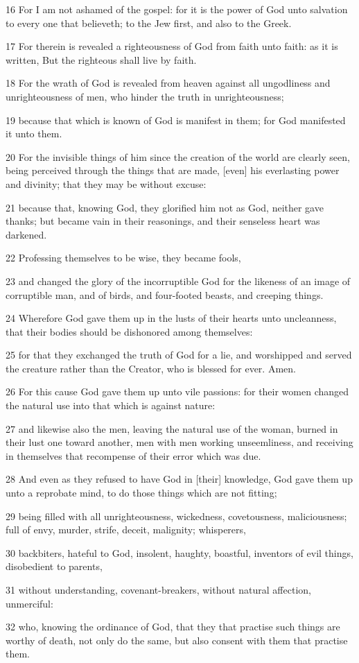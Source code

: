 \par 16 For I am not ashamed of the gospel: for it is the power of God unto salvation to every one that believeth; to the Jew first, and also to the Greek.
\par 17 For therein is revealed a righteousness of God from faith unto faith: as it is written, But the righteous shall live by faith.
\par 18 For the wrath of God is revealed from heaven against all ungodliness and unrighteousness of men, who hinder the truth in unrighteousness;
\par 19 because that which is known of God is manifest in them; for God manifested it unto them.
\par 20 For the invisible things of him since the creation of the world are clearly seen, being perceived through the things that are made, [even] his everlasting power and divinity; that they may be without excuse:
\par 21 because that, knowing God, they glorified him not as God, neither gave thanks; but became vain in their reasonings, and their senseless heart was darkened.
\par 22 Professing themselves to be wise, they became fools,
\par 23 and changed the glory of the incorruptible God for the likeness of an image of corruptible man, and of birds, and four-footed beasts, and creeping things.
\par 24 Wherefore God gave them up in the lusts of their hearts unto uncleanness, that their bodies should be dishonored among themselves:
\par 25 for that they exchanged the truth of God for a lie, and worshipped and served the creature rather than the Creator, who is blessed for ever. Amen.
\par 26 For this cause God gave them up unto vile passions: for their women changed the natural use into that which is against nature:
\par 27 and likewise also the men, leaving the natural use of the woman, burned in their lust one toward another, men with men working unseemliness, and receiving in themselves that recompense of their error which was due.
\par 28 And even as they refused to have God in [their] knowledge, God gave them up unto a reprobate mind, to do those things which are not fitting;
\par 29 being filled with all unrighteousness, wickedness, covetousness, maliciousness; full of envy, murder, strife, deceit, malignity; whisperers,
\par 30 backbiters, hateful to God, insolent, haughty, boastful, inventors of evil things, disobedient to parents,
\par 31 without understanding, covenant-breakers, without natural affection, unmerciful:
\par 32 who, knowing the ordinance of God, that they that practise such things are worthy of death, not only do the same, but also consent with them that practise them.

